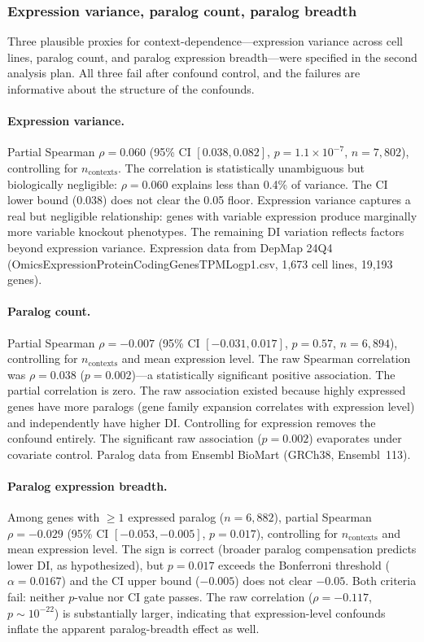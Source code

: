 \documentclass[11pt]{article}
\begin{document}
\subsubsection{Expression variance, paralog count, paralog breadth}

Three plausible proxies for context-dependence---expression variance
across cell lines, paralog count, and paralog expression breadth---were
specified in the second analysis plan.  All three fail after confound control, and the
failures are informative about the structure of the confounds.

\paragraph{Expression variance.}
Partial Spearman $\rho = 0.060$ (95\% CI $[0.038, 0.082]$,
$p = 1.1 \times 10^{-7}$, $n = 7{,}802$), controlling for
$n_{\mathrm{contexts}}$.  The correlation is statistically unambiguous
but biologically negligible: $\rho = 0.060$ explains less than 0.4\% of
variance.  The CI lower bound (0.038) does not clear the 0.05 floor.
Expression variance captures a real but negligible relationship: genes
with variable expression produce marginally more variable knockout
phenotypes.  The remaining DI variation reflects factors beyond
expression variance.  Expression data from DepMap 24Q4
(OmicsExpressionProteinCodingGenesTPMLogp1.csv, 1{,}673 cell lines,
19{,}193 genes).

\paragraph{Paralog count.}
Partial Spearman $\rho = -0.007$ (95\% CI $[-0.031, 0.017]$,
$p = 0.57$, $n = 6{,}894$), controlling for $n_{\mathrm{contexts}}$ and
mean expression level.  The raw Spearman correlation was
$\rho = 0.038$ ($p = 0.002$)---a statistically significant positive
association.  The partial correlation is zero.  The raw association
existed because highly expressed genes have more paralogs (gene family
expansion correlates with expression level) and independently have
higher DI.  Controlling for expression removes the confound entirely.
The significant raw association ($p = 0.002$) evaporates under
covariate control.
Paralog data from Ensembl BioMart (GRCh38, Ensembl~113).

\paragraph{Paralog expression breadth.}
Among genes with $\geq 1$ expressed paralog ($n = 6{,}882$), partial
Spearman $\rho = -0.029$ (95\% CI $[-0.053, -0.005]$, $p = 0.017$),
controlling for $n_{\mathrm{contexts}}$ and mean expression level.  The
sign is correct (broader paralog compensation predicts lower DI, as
hypothesized), but $p = 0.017$ exceeds the Bonferroni threshold
($\alpha = 0.0167$) and the CI upper bound ($-0.005$) does not
clear $-0.05$.  Both criteria fail: neither $p$-value nor CI gate passes.
The raw correlation
($\rho = -0.117$, $p \sim 10^{-22}$) is substantially larger,
indicating that expression-level confounds inflate the apparent
paralog-breadth effect as well.
\end{document}
